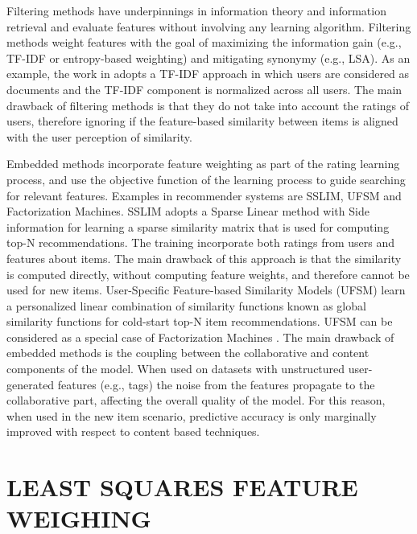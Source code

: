 \documentclass{sig-alternate}
\begin{document}
Filtering methods have underpinnings in information theory
and information retrieval and evaluate features without involving
any learning algorithm. Filtering methods weight features
with the goal of maximizing the information gain (e.g., TF-IDF or
entropy-based weighting) and mitigating synonymy (e.g., LSA). As
an example, the work in adopts a TF-IDF approach in which
users are considered as documents and the TF-IDF component is
normalized across all users. The main drawback of filtering methods
is that they do not take into account the ratings of users, therefore
ignoring if the feature-based similarity between items is aligned
with the user perception of similarity.

Embedded methods incorporate feature weighting as part of the
rating learning process, and use the objective function of the learning
process to guide searching for relevant features. Examples in
recommender systems are SSLIM, UFSM \cite{1}and Factorization
Machines. SSLIM adopts a Sparse Linear method with Side
information for learning a sparse similarity matrix that is used
for computing top-N recommendations. The training incorporate
both ratings from users and features about items. The main
drawback of this approach is that the similarity is computed directly,
without computing feature weights, and therefore cannot
be used for new items. User-Specific Feature-based Similarity Models
(UFSM) learn a personalized linear combination of similarity
functions known as global similarity functions for cold-start top-N
item recommendations. UFSM can be considered as a special case
of Factorization Machines \cite{1}. The main drawback of embedded
methods is the coupling between the collaborative and content
components of the model. When used on datasets with unstructured
user-generated features (e.g., tags) the noise from the features
propagate to the collaborative part, affecting the overall quality of
the model. For this reason, when used in the new item scenario,
predictive accuracy is only marginally improved with respect to
content based techniques.

\section{LEAST SQUARES FEATURE WEIGHING}
\end{document}
